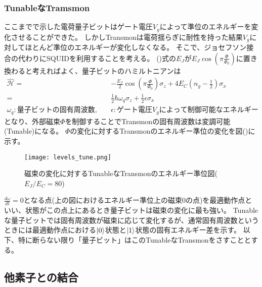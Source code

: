         \subsubsection{TunableなTramsmon}
        ここまでで示した電荷量子ビットはゲート電圧$V_g$によって準位のエネルギーを変化させることができた。
        しかしTransmonは電荷揺らぎに耐性を持った結果$V_g$に対してほとんど準位のエネルギーが変化しなくなる。
        そこで、ジョセフソン接合の代わりにSQUIDを利用することを考える。
        ()式の$E_J$が$E_J\cos(\pi \frac{\Phi}{\Phi_0})$に置き換わると考えればよく、量子ビットのハミルトニアンは
        \begin{equation}
            \begin{aligned}
                \hat{\mathcal{H}} =&-\frac{E_J}{2}\cos(\pi \frac{\Phi}{\Phi_0})\sigma_z + 4E_C ( n_g-\frac{1}{2} ) \sigma_x\\
                =& \frac{1}{2}\hbar \omega_q \sigma_z + \frac{1}{2}\epsilon \sigma_x\\
                \omega_q:\mathrm{量子ビットの固有周波数},\quad & \epsilon : \mathrm{ゲート電圧}V_g\mathrm{によって制御可能なエネルギー}
            \end{aligned}
        \end{equation}
        となり、外部磁束$\Phi$を制御することでTransmonの固有周波数は変調可能(Tunable)になる。
        $\Phi$の変化に対するTransmonのエネルギー準位の変化を図()に示す。\\
        \begin{figure}[H]
            \begin{center}
                \texttt{[image: levels\_tune.png]}
                \caption{磁束の変化に対するTunableなTransmonのエネルギー準位図($E_J/E_C = 80$)}
            \end{center}
        \end{figure}
        $\frac{d\omega}{dt}=0$となる点(上の図におけるエネルギー準位上の磁束0の点)を最適動作点といい、状態がこの点上にあるとき量子ビットは磁束の変化に最も強い。
        Tunableな量子ビットでは固有周波数が磁束に応じて変化するが、通常固有周波数というときには最適動作点における$\ket{0}$状態と$\ket{1}$状態の固有エネルギー差を示す。
        以下、特に断らない限り「量子ビット」はこのTunableなTransmonをさすこととする。

    \subsection{他素子との結合}
